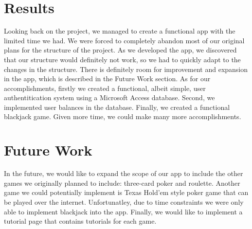 \documentclass[10pt,conference,onecolumn,compsoc]{IEEEtran}
\begin{document}
\section{Results}
Looking back on the project, we managed to create a functional app with the limited time we had. We were forced to completely abandon most of our original plans for the structure of the project. As we developed the app, we discovered that our structure would definitely not work, so we had to quickly adapt to the changes in the structure. There is definitely room for improvement and expansion in the app, which is described in the Future Work section. As for our accomplishments, firstly we created a functional, albeit simple, user authentitication system using a Microsoft Access database. Second, we implemented user balances in the database. Finally, we created a functional blackjack game. Given more time, we could make many more accomplishments.


\section{Future Work}
In the future, we would like to expand the scope of our app to include the other games we originally planned to include: three-card poker and roulette. Another game we could potentially implement is  Texas Hold'em style poker game that can be played over the internet. Unfortunatley, due to time constraints we were only able to implement blackjack into the app. Finally, we would like to implement a tutorial page that contains tutorials for each game. 
\end{document}
